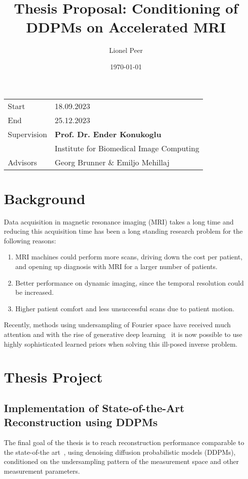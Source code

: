 \documentclass[a4paper]{article}
\title{Thesis Proposal: Conditioning of DDPMs on Accelerated MRI}
\author{Lionel Peer}
\date{\today}
\begin{document}
\maketitle
\vfill
\begin{tabular}{l l}
    Start       & 18.09.2023                               \\
    End         & 25.12.2023                               \\
    Supervision & \textbf{Prof. Dr. Ender Konukoglu}       \\
                & Institute for Biomedical Image Computing \\
    Advisors    & Georg Brunner \& Emiljo Mehillaj
\end{tabular}
\tableofcontents
\newpage

\section{Background}
Data acquisition in magnetic resonance imaging (MRI) takes a long time and reducing this acquisition time has been a long standing research problem for the following reasons:
\begin{enumerate}
    \item MRI machines could perform more scans, driving down the cost per patient, and opening up diagnosis with MRI for a larger number of patients.
    \item Better performance on dynamic imaging, since the temporal resolution could be increased.
    \item Higher patient comfort and less unsuccessful scans due to patient motion.
\end{enumerate}
Recently, methods using undersampling of Fourier space have received much attention and with the rise of generative deep learning~\cite{kingma2022autoencoding,goodfellow2014generative,ho2020denoising} it is now possible to use highly sophisticated learned priors when solving this ill-posed inverse problem.

\section{Thesis Project}

\subsection{Implementation of State-of-the-Art Reconstruction using DDPMs}
The final goal of the thesis is to reach reconstruction performance comparable to the state-of-the art~\cite{10.1007/978-3-031-16446-0_62}, using denoising diffusion probabilistic models (DDPMs), conditioned on the undersampling pattern of the measurement space and other measurement parameters.
\end{document}
